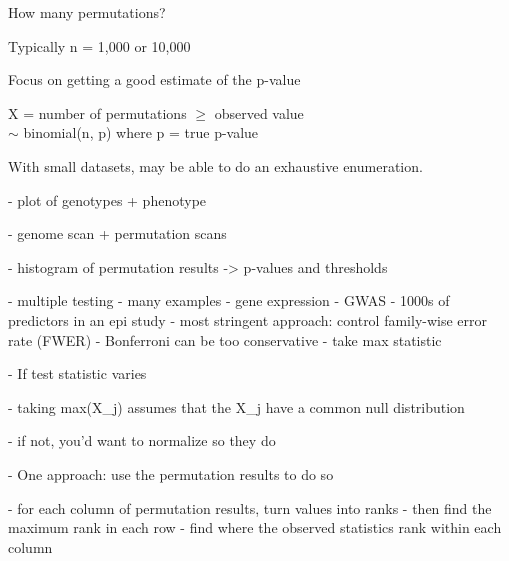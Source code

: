 \documentclass[aspectratio=169,12pt,t]{beamer}
\begin{document}
\begin{frame}{How many permutations?}

  \bbi
  \item Typically n = 1,000 or 10,000
  \item Focus on getting a good estimate of the p-value
  \item X = number of permutations $\ge$ observed value \\[8pt]
    \hspace{3mm} $\sim$ binomial(n, p) where p = true p-value
  \item With small datasets, may be able to do an {\hilit exhaustive enumeration}.
    \ei

\end{frame}



\begin{frame}[c]{}
\end{frame}



- plot of genotypes + phenotype

- genome scan + permutation scans

- histogram of permutation results
  -> p-values and thresholds

- multiple testing
  - many examples
    - gene expression
    - GWAS
    - 1000s of predictors in an epi study
  - most stringent approach: control family-wise error rate (FWER)
  - Bonferroni can be too conservative
  - take max statistic

- If test statistic varies

  - taking max(X\_j) assumes that the X\_j have a common null
    distribution

  - if not, you'd want to normalize so they do

  - One approach: use the permutation results to do so

  - for each column of permutation results, turn values into ranks
  - then find the maximum rank in each row
  - find where the observed statistics rank within each column
\end{document}
